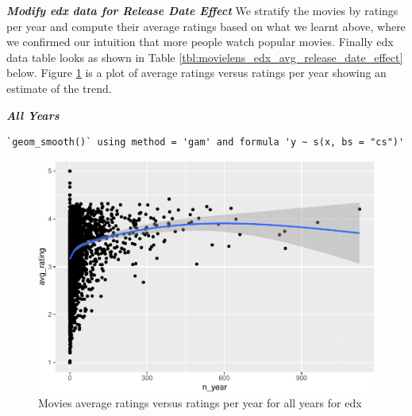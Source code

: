\documentclass[
]{article}
\begin{document}
\newpage

\textbf{\emph{Modify edx data for Release Date Effect}} We stratify the
movies by ratings per year and compute their average ratings based on
what we learnt above, where we confirmed our intuition that more people
watch popular movies. Finally edx data table looks as shown in Table
\ref{tbl:movielens_edx_avg_release_date_effect} below. Figure
\ref{fig:movies_average_ratings_versus_ratings_per_year_for_all_years_for_edx}
is a plot of average ratings versus ratings per year showing an estimate
of the trend.

\textbf{\emph{All Years}}

\begin{verbatim}
`geom_smooth()` using method = 'gam' and formula 'y ~ s(x, bs = "cs")'
\end{verbatim}

\begin{figure}
\centering
\includegraphics{figures/md_5-1.pdf}
\caption{Movies average ratings versus ratings per year for all years
for
edx\label{fig:movies_average_ratings_versus_ratings_per_year_for_all_years_for_edx}}
\end{figure}
\end{document}
